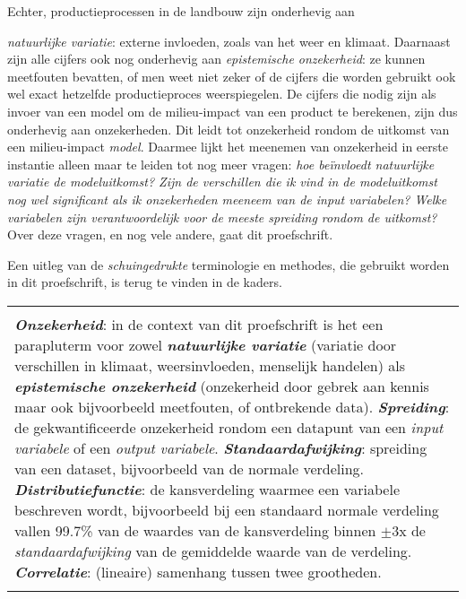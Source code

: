 \documentclass[12pt]{amsart}
\begin{document}
\normalsize{Echter,  productieprocessen in de landbouw zijn onderhevig aan {\textit{natuurlijke variatie}: externe invloeden, zoals van het weer en klimaat. Daarnaast zijn alle cijfers ook nog onderhevig aan \textit{epistemische onzekerheid}: ze kunnen meetfouten bevatten, of men weet niet zeker of de cijfers die worden gebruikt ook wel exact hetzelfde productieproces weerspiegelen.  De cijfers die nodig zijn als invoer van een model om de milieu-impact van een product te berekenen, zijn dus onderhevig aan onzekerheden. Dit leidt tot onzekerheid rondom de uitkomst van een milieu-impact \textit{model}. Daarmee lijkt het meenemen van onzekerheid in eerste instantie alleen maar te leiden tot nog meer vragen: \textit{hoe be\"{i}nvloedt natuurlijke variatie de modeluitkomst? Zijn de verschillen die ik vind in de modeluitkomst nog wel significant als ik onzekerheden meeneem van de input variabelen? Welke variabelen zijn verantwoordelijk voor de meeste spreiding rondom de uitkomst?} Over deze vragen, en nog vele andere, gaat dit proefschrift. 

Een uitleg van de \textit{schuingedrukte} terminologie en methodes, die gebruikt worden in dit proefschrift, is terug te vinden in de kaders. 

\vspace{0.5cm}
\footnotesize{
\begin{tabular}{|p{}|}
\hline
\mbox{}\\
\textit{\textbf{Onzekerheid}}: in de context van dit proefschrift is het een parapluterm voor zowel \textit{\textbf{natuurlijke variatie}} (variatie door verschillen in klimaat, weersinvloeden, menselijk handelen) als \textit{\textbf{epistemische onzekerheid}} (onzekerheid door gebrek aan kennis maar ook bijvoorbeeld meetfouten, of ontbrekende data). 
\textit{\textbf{Spreiding}}: de gekwantificeerde onzekerheid rondom een datapunt van een \textit{input variabele} of een \textit{output variabele}. 
\textit{\textbf{Standaardafwijking}}: spreiding van een dataset, bijvoorbeeld van de normale verdeling. 
\textit{\textbf{Distributiefunctie}}: de kansverdeling waarmee een variabele beschreven wordt, bijvoorbeeld bij een standaard normale verdeling vallen 99.7\% van de waardes van de kansverdeling binnen $\pm$3x de \textit{standaardafwijking} van de gemiddelde waarde van de verdeling. 
\textit{\textbf{Correlatie}}: (lineaire) samenhang tussen twee grootheden. \\ 
\mbox{}\\ \hline
\end{tabular}}
\vspace{0.5cm}

}}
\end{document}
